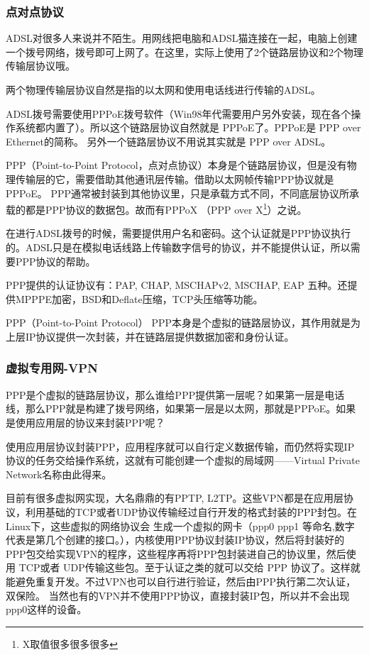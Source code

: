 \subsubsection{点对点协议}

ADSL对很多人来说并不陌生。用网线把电脑和ADSL猫连接在一起，电脑上创建一个拨号网络，拨号即可上网了。在这里，实际上使用了2个链路层协议和2个物理传输层协议哦。

两个物理传输层协议自然是指的以太网和使用电话线进行传输的ADSL。

ADSL拨号需要使用PPPoE拨号软件（Win98年代需要用户另外安装，现在各个操作系统都内置了）。所以这个链路层协议自然就是 PPPoE了。PPPoE是 PPP over Ethernet的简称。
另外一个链路层协议不用说其实就是 PPP over ADSL。

PPP（Point-to-Point Protocol，点对点协议）本身是个链路层协议，但是没有物理传输层的它，需要借助其他通讯层传输。借助以太网帧传输PPP协议就是 PPPoE。
PPP通常被封装到其他协议里，只是承载方式不同，不同底层协议所承载的都是PPP协议的数据包。故而有PPPoX （PPP over X\footnote{X取值很多很多很多}）之说。


在进行ADSL拨号的时候，需要提供用户名和密码。这个认证就是PPP协议执行的。ADSL只是在模拟电话线路上传输数字信号的协议，并不能提供认证，所以需要PPP协议的帮助。

PPP提供的认证协议有：PAP, CHAP, MSCHAPv2, MSCHAP, EAP 五种。还提供MPPPE加密，BSD和Deflate压缩，TCP头压缩等功能。

PPP（Point-to-Point Protocol） PPP本身是个虚拟的链路层协议，其作用就是为上层IP协议提供一次封装，并在链路层提供数据加密和身份认证。

\subsubsection{虚拟专用网-VPN}

PPP是个虚拟的链路层协议，那么谁给PPP提供第一层呢？如果第一层是电话线，那么PPP就是构建了拨号网络，如果第一层是以太网，那就是PPPoE。如果是使用应用层的协议来封装PPP呢？

使用应用层协议封装PPP，应用程序就可以自行定义数据传输，而仍然将实现IP协议的任务交给操作系统，这就有可能创建一个虚拟的局域网——Virtual Private Network名称由此得来。

目前有很多虚拟网实现，大名鼎鼎的有PPTP, L2TP。这些VPN都是在应用层协议，利用基础的TCP或者UDP协议传输经过自行开发的格式封装的PPP封包。在Linux下，这些虚拟的网络协议会
生成一个虚拟的网卡（ppp0 ppp1 等命名,数字代表是第几个创建的接口。），内核使用PPP协议封装IP协议，然后将封装好的PPP包交给实现VPN的程序，这些程序再将PPP包封装进自己的协议里，然后使用 TCP或者 UDP传输这些包。至于认证之类的就可以交给 PPP 协议了。这样就能避免重复开发。不过VPN也可以自行进行验证，然后由PPP执行第二次认证，双保险。%
当然也有的VPN并不使用PPP协议，直接封装IP包，所以并不会出现ppp0这样的设备。

